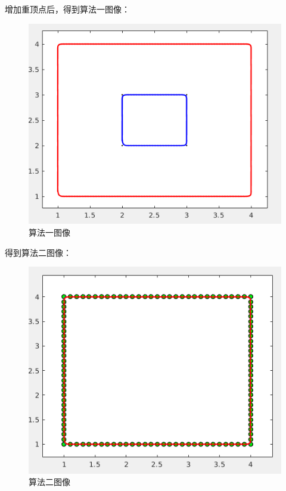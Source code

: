\documentclass[12pt,a4paper]{article}
\begin{document}
增加重顶点后，得到算法一图像：
\begin{figure}[ht]
	\centering
	\includegraphics[scale=0.4]{./figures/right1.png}
	\caption{算法一图像}
	\label{fig:label}	
\end{figure} 

得到算法二图像：    
\begin{figure}[ht]
	\centering
	\includegraphics[scale=0.4]{./figures/right2.png}
	\caption{算法二图像}
	\label{fig:label}	
\end{figure}   
\end{document}
